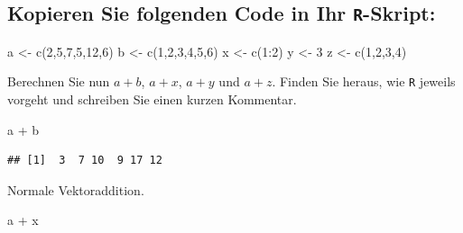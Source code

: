 \documentclass[12pt,a4paper]{article}
\newenvironment{Shaded}{\begin{snugshade}}{\end{snugshade}}
\newcommand{\DecValTok}[1]{\textcolor[rgb]{0.00,0.00,0.81}{#1}}
\newcommand{\FunctionTok}[1]{\textcolor[rgb]{0.00,0.00,0.00}{#1}}
\newcommand{\NormalTok}[1]{#1}
\newcommand{\OtherTok}[1]{\textcolor[rgb]{0.56,0.35,0.01}{#1}}
\newcommand{\SpecialCharTok}[1]{\textcolor[rgb]{0.00,0.00,0.00}{#1}}
\begin{document}
\vspace{0.5cm}

\hypertarget{kopieren-sie-folgenden-code-in-ihr--skript}{%
\subsection{\texorpdfstring{Kopieren Sie folgenden Code in Ihr
\texttt{R}-Skript:}{Kopieren Sie folgenden Code in Ihr -Skript:}}\label{kopieren-sie-folgenden-code-in-ihr--skript}}

\begin{Shaded}
\begin{Highlighting}[]
\NormalTok{    a }\OtherTok{\textless{}{-}} \FunctionTok{c}\NormalTok{(}\DecValTok{2}\NormalTok{,}\DecValTok{5}\NormalTok{,}\DecValTok{7}\NormalTok{,}\DecValTok{5}\NormalTok{,}\DecValTok{12}\NormalTok{,}\DecValTok{6}\NormalTok{)}
\NormalTok{    b }\OtherTok{\textless{}{-}} \FunctionTok{c}\NormalTok{(}\DecValTok{1}\NormalTok{,}\DecValTok{2}\NormalTok{,}\DecValTok{3}\NormalTok{,}\DecValTok{4}\NormalTok{,}\DecValTok{5}\NormalTok{,}\DecValTok{6}\NormalTok{)}
\NormalTok{    x }\OtherTok{\textless{}{-}} \FunctionTok{c}\NormalTok{(}\DecValTok{1}\SpecialCharTok{:}\DecValTok{2}\NormalTok{)}
\NormalTok{    y }\OtherTok{\textless{}{-}} \DecValTok{3}
\NormalTok{    z }\OtherTok{\textless{}{-}} \FunctionTok{c}\NormalTok{(}\DecValTok{1}\NormalTok{,}\DecValTok{2}\NormalTok{,}\DecValTok{3}\NormalTok{,}\DecValTok{4}\NormalTok{)}
\end{Highlighting}
\end{Shaded}

Berechnen Sie nun \(a+b\), \(a+x\), \(a+y\) und \(a+z\). Finden Sie
heraus, wie \texttt{R} jeweils vorgeht und schreiben Sie einen kurzen
Kommentar.

\begin{Shaded}
\begin{Highlighting}[]
\NormalTok{    a }\SpecialCharTok{+}\NormalTok{ b }
\end{Highlighting}
\end{Shaded}

\begin{verbatim}
## [1]  3  7 10  9 17 12
\end{verbatim}

Normale Vektoraddition.

\begin{Shaded}
\begin{Highlighting}[]
\NormalTok{    a }\SpecialCharTok{+}\NormalTok{ x}
\end{Highlighting}
\end{Shaded}
\end{document}
